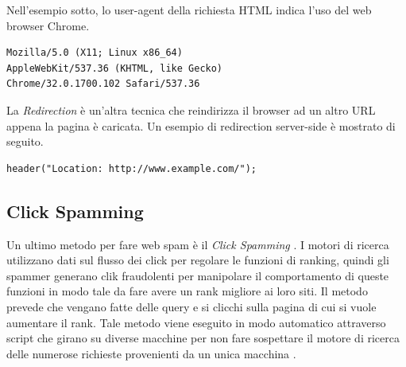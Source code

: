 Nell'esempio sotto, lo user-agent della richiesta HTML indica l'uso del web browser Chrome.
\begin{lstlisting}[frame=trbl,postbreak=\space, breakindent=5pt, breaklines]
Mozilla/5.0 (X11; Linux x86_64) 
AppleWebKit/537.36 (KHTML, like Gecko) 
Chrome/32.0.1700.102 Safari/537.36
\end{lstlisting}
La \textit{Redirection} è un'altra tecnica che reindirizza il browser ad un altro URL appena la pagina è caricata. Un esempio di redirection server-side è mostrato di seguito.
\begin{lstlisting}[frame=trbl,postbreak=\space, breakindent=5pt, breaklines]
header("Location: http://www.example.com/");
\end{lstlisting}
\subsection{Click Spamming}
Un ultimo metodo per fare web spam è il \textit{Click Spamming} \cite{Spirin:2012:SWS:2207243.2207252}. I motori di ricerca utilizzano dati sul flusso dei click per regolare le funzioni di ranking, quindi  gli spammer generano clik fraudolenti per manipolare il comportamento di queste funzioni in modo tale da fare avere un rank migliore ai loro siti. Il metodo prevede che vengano fatte delle query e si clicchi sulla pagina di cui si vuole aumentare il rank. Tale metodo viene eseguito in modo automatico attraverso script che girano su diverse macchine per non fare sospettare il motore di ricerca delle numerose richieste provenienti da un unica macchina \cite{Spirin:2012:SWS:2207243.2207252}.


